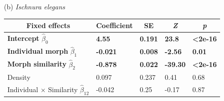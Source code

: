 \documentclass[12pt,]{article}
\begin{document}
\begin{table}[ht]
(b) \textit{Ischnura elegans} \\
\begin{tabular}{lllll}
\hline
\multicolumn{1}{c}{Fixed effects} & \multicolumn{1}{c}{Coefficient} & \multicolumn{1}{c}{SE} & \multicolumn{1}{c}{\textit{Z}} & \multicolumn{1}{c}{\textit{p}} \\ \hline
\textbf{Intercept} $\hat{\beta}_{0}$    & \textbf{4.55} &  \textbf{0.191} & \textbf{23.8}  & \textbf{\textless{}2e-16}  \\
\textbf{Individual morph} $\hat{\beta}_{1}$               & \textbf{-0.021}                 & \textbf{0.008}         & \textbf{-2.56}                 & \textbf{0.01}                  \\
\textbf{Morph similarity} $\hat{\beta}_{2}$           & \textbf{-0.878}                 & \textbf{0.022}         & \textbf{-39.30}                & \textbf{\textless{}2e-16}      \\
Density                             & 0.097                           & 0.237                  & 0.41                           & 0.68                           \\
Individual $\times$ Similarity $\hat{\beta}_{12}$                 & -0.042                          & 0.25                 & -0.17                          & 0.87                           \\ \hline
\end{tabular}
\label{table1:GLMM}
\end{table}
\end{document}
